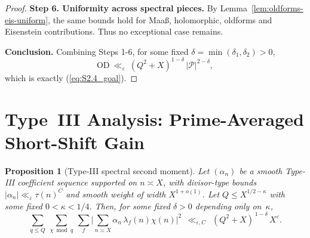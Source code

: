 \documentclass[11pt]{article}
\def\eqref#1{(\ref{#1})}%
\newtheorem{proposition}[lemma]{Proposition}
\theoremstyle{definition}
\theoremstyle{remark}
\numberwithin{equation}{part}
\begin{document}
\begin{proof}
	\smallskip
	\textbf{Step 6. Uniformity across spectral pieces.}
	By Lemma~\ref{lem:oldforms-eis-uniform}, the same bounds hold for Maa\ss, holomorphic, oldforms and Eisenstein contributions. Thus no exceptional case remains.

	\smallskip
	\textbf{Conclusion.}
	Combining Steps 1-6, for some fixed $\delta=\min(\delta_1,\delta_2)>0$,
	\[
		\mathrm{OD}\ \ll_\varepsilon\ (Q^2+X)^{1-\delta}\,|\mathcal P|^{2-\delta},
	\]
	which is exactly \eqref{eq:S2.4_goal}.
\end{proof}

\section{Type~III Analysis: Prime-Averaged Short-Shift Gain}

\begin{proposition}[Type-III spectral second moment]\label{prop:typeIII}
	Let $(\alpha_n)$ be a smooth Type-III coefficient sequence supported on $n\asymp X$, with divisor-type bounds $|\alpha_n|\ll_\varepsilon \tau(n)^C$ and smooth weight of width $X^{1+o(1)}$.
	Let $Q\le X^{1/2-\kappa}$ with some fixed $0<\kappa<1/4$. Then, for some fixed $\delta>0$ depending only on~$\kappa$,
	\[
		\sum_{q\le Q}\ \sum_{\chi\bmod q}\ \sum_{f}
		\Bigg|\sum_{n\asymp X}\alpha_n\,\lambda_f(n)\chi(n)\Bigg|^2
		\ \ \ll_{\varepsilon,C}\ \ (Q^2+X)^{\,1-\delta}\,X^{\varepsilon}.
	\]
\end{proposition}
\end{document}
